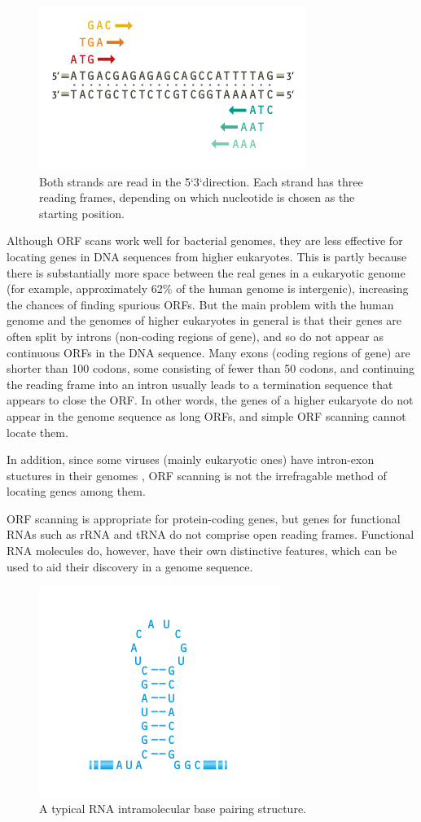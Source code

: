 \begin{figure}[!ht]
	\centering
	\includegraphics[width=.6\textwidth]{figures/ORF2.png}
	\caption{Both
	strands are read in the 5`3`direction. Each
	strand has three reading frames, depending
	on which nucleotide is chosen as the
	starting position.\label{o:latex_friendly_zone}}
\end{figure}

Although ORF scans work well for bacterial genomes, they are less effective for locating genes in DNA sequences from higher eukaryotes. 
This is partly because there is substantially more space between the real genes in a eukaryotic genome (for example, approximately 62\% of the human genome is intergenic), increasing the chances of finding spurious ORFs. 
But the main problem with the human genome and the genomes of higher eukaryotes in general is that their genes are often split by introns (non-coding regions of gene), and so do not appear as continuous ORFs in the DNA sequence. 
Many exons (coding regions of gene) are shorter than 100 codons, some consisting of fewer than 50 codons, and continuing the reading frame into an intron usually leads to a termination sequence that appears to close the ORF. 
In other words, the genes of a higher eukaryote do not appear in the genome sequence as long ORFs, and simple ORF scanning cannot locate them.

In addition, since some viruses (mainly eukaryotic ones) have intron-exon stuctures in their genomes \cite{Genes3}, ORF scanning is not the irrefragable method of locating genes among them.

ORF scanning is appropriate for protein-coding genes, but genes for functional RNAs such as rRNA and tRNA do not comprise open reading frames. 
Functional RNA molecules do, however, have their own distinctive features, which can be used to aid their discovery in a genome sequence. 

\begin{figure}[!ht]
	\centering
	\includegraphics[width=.5\textwidth]{figures/rna.png}
	\caption{A typical RNA intramolecular base pairing
	structure.\label{o:latex_friendly_zone}}
\end{figure}

